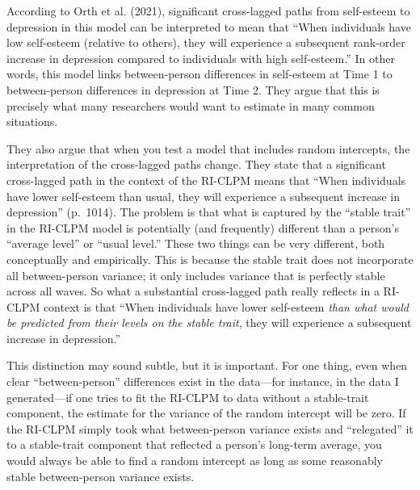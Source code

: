 \documentclass[
  english,
  man,floatsintext]{apa6}
\begin{document}
According to Orth et al. (2021), significant cross-lagged paths from self-esteem to depression in this model can be interpreted to mean that ``When individuals have low self-esteem (relative to others), they will experience a subsequent rank-order increase in depression compared to individuals with high self-esteem.'' In other words, this model links between-person differences in self-esteem at Time 1 to between-person differences in depression at Time 2. They argue that this is precisely what many researchers would want to estimate in many common situations.

They also argue that when you test a model that includes random intercepts, the interpretation of the cross-lagged paths change. They state that a significant cross-lagged path in the context of the RI-CLPM means that ``When individuals have lower self-esteem than usual, they will experience a subsequent increase in depression'' (p.~1014). The problem is that what is captured by the ``stable trait'' in the RI-CLPM model is potentially (and frequently) different than a person's ``average level'' or ``usual level.'' These two things can be very different, both conceptually and empirically. This is because the stable trait does not incorporate all between-person variance; it only includes variance that is perfectly stable across all waves. So what a substantial cross-lagged path really reflects in a RI-CLPM context is that ``When individuals have lower self-esteem \emph{than what would be predicted from their levels on the stable trait}, they will experience a subsequent increase in depression.''

This distinction may sound subtle, but it is important. For one thing, even when clear ``between-person'' differences exist in the data---for instance, in the data I generated---if one tries to fit the RI-CLPM to data without a stable-trait component, the estimate for the variance of the random intercept will be zero. If the RI-CLPM simply took what between-person variance exists and ``relegated'' it to a stable-trait component that reflected a person's long-term average, you would always be able to find a random intercept as long as some reasonably stable between-person variance exists.
\end{document}

